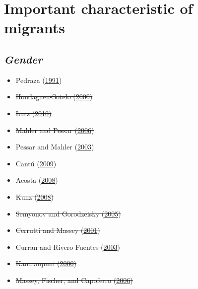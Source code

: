 \documentclass[
]{article}
\providecommand{\tightlist}{%
  \setlength{\itemsep}{0pt}\setlength{\parskip}{0pt}}
\begin{document}
\hypertarget{important-characteristic-of-migrants}{%
\section{\texorpdfstring{\textbf{Important characteristic of
migrants}}{Important characteristic of migrants}}\label{important-characteristic-of-migrants}}

\hypertarget{gender}{%
\subsection{\texorpdfstring{\emph{Gender}}{Gender}}\label{gender}}

\begin{itemize}
\tightlist
\item
  Pedraza (\protect\hyperlink{ref-pedraza1991women}{1991})
\item
  \sout{Hondagneu-Sotelo
  (\protect\hyperlink{ref-hondagneu2000feminism}{2000})}
\item
  \sout{Lutz (\protect\hyperlink{ref-lutz2010gender}{2010})}\\
\item
  \sout{Mahler and Pessar
  (\protect\hyperlink{ref-mahler2006gender}{2006})}\\
\item
  Pessar and Mahler
  (\protect\hyperlink{ref-pessar2003transnational}{2003})\\
\item
  Cantú (\protect\hyperlink{ref-cantu2009sexuality}{2009})\\
\item
  Acosta (\protect\hyperlink{ref-acosta2008lesbianas}{2008})\\
\item
  \sout{Kunz (\protect\hyperlink{ref-kunz2008remittances}{2008})}\\
\item
  \sout{Semyonov and Gorodzeisky
  (\protect\hyperlink{ref-semyonov2005labor}{2005})}\\
\item
  \sout{Cerrutti and Massey
  (\protect\hyperlink{ref-cerrutti2001auspices}{2001})}\\
\item
  \sout{Curran and Rivero-Fuentes
  (\protect\hyperlink{ref-curran2003engendering}{2003})}\\
\item
  \sout{Kanaiaupuni
  (\protect\hyperlink{ref-kanaiaupuni2000reframing}{2000})}\\
\item
  \sout{Massey, Fischer, and Capoferro
  (\protect\hyperlink{ref-massey2006international}{2006})}
\end{itemize}
\end{document}
